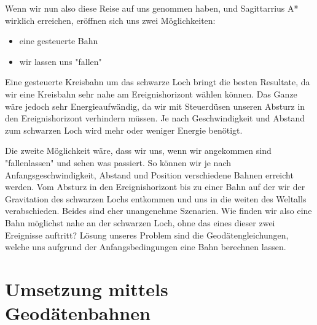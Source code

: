 \begin{refsection}
	Wenn wir nun also diese Reise auf uns genommen haben, und Sagittarrius A* wirklich erreichen, eröffnen sich uns zwei Möglichkeiten:
	\begin{itemize}
		\item eine gesteuerte Bahn
		\item wir lassen uns "fallen"
	\end{itemize}
	Eine gesteuerte Kreisbahn um das schwarze Loch bringt die besten Resultate, da wir eine Kreisbahn sehr nahe am Ereignishorizont wählen können. Das Ganze wäre jedoch sehr Energieaufwändig, da wir mit Steuerdüsen unseren Absturz in den Ereignishorizont verhindern müssen. Je nach Geschwindigkeit und Abstand zum schwarzen Loch wird mehr oder weniger Energie benötigt.
	
	Die zweite Möglichkeit wäre, dass wir uns, wenn wir angekommen sind "fallenlassen" und sehen was passiert. So können wir je nach Anfangsgeschwindigkeit, Abstand und Position verschiedene Bahnen erreicht werden. Vom Absturz in den Ereignishorizont bis zu einer Bahn auf der wir der Gravitation des schwarzen Lochs entkommen und uns in die weiten des Weltalls verabschieden. Beides sind eher unangenehme Szenarien. 
	Wie finden wir also eine Bahn möglichst nahe an der schwarzen Loch, ohne das eines dieser zwei Ereignisse auftritt?
	Lösung unseres Problem sind die Geodätengleichungen, welche uns aufgrund der Anfangsbedingungen eine Bahn berechnen lassen.
	
	\section{Umsetzung mittels Geodätenbahnen}
	

\end{refsection}
